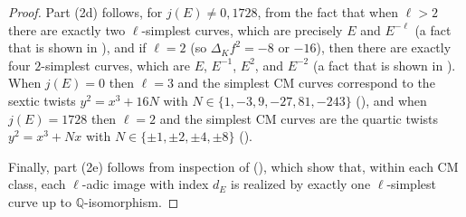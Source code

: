 \documentclass[11pt]{amsart}
\theoremstyle{definition}
\newcommand{\Q}{\mathbb{Q}}
\begin{document}
\begin{proof}
Part (2d) follows, for $j(E)\neq 0,1728$, from the fact that when $\ell>2$ there are exactly two $\ell$-simplest curves, which are precisely $E$ and $E^{-\ell}$ (a fact that is shown in \cite[Table 4]{modelspaper}), and if $\ell=2$ (so $\Delta_Kf^2=-8$ or $-16$), then there are exactly four $2$-simplest curves, which are $E$, $E^{-1}$, $E^2$, and $E^{-2}$ (a fact that is shown in \cite[Table 2]{modelspaper}). When $j(E)=0$ then $\ell=3$ and the simplest CM curves correspond to the sextic twists $y^2=x^3 + 16N$ with  $N\in \{1,-3,9,-27,81,-243 \}$ (\cite[Table 4]{modelspaper}), and when  $j(E)=1728$ then $\ell=2$ and the simplest CM curves are the quartic twists $y^2=x^3+Nx$ with $N\in \{\pm 1, \pm 2, \pm 4, \pm 8\}$ (\cite[Table 2]{modelspaper}).

Finally, part (2e) follows from inspection of (\cite[Tables 2 and 4]{modelspaper}), which show that, within each CM class, each $\ell$-adic image with index $d_E$ is realized by exactly one $\ell$-simplest curve up to $\Q$-isomorphism.
\end{proof}
\end{document}
